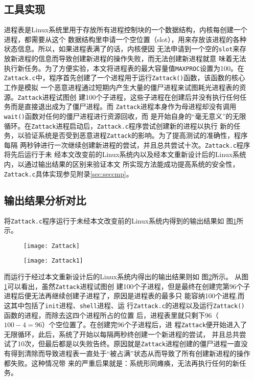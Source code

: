 \documentclass{swfuthesism}
\begin{document}
\subsection{工具实现}
进程表是Linux系统里用于存放所有进程控制块的一个数据结构，内核每创建一个进程，都需要从这个
数据结构里申请一个空位置（slot），用来存放该进程的各种状态信息。所以，如果进程表满了的话，内核便因
无法申请到一个空的\texttt{slot}来存放新进程的信息而导致创建新进程的操作失败，而无法创建新进程就意
味着无法执行新任务。为了方便实验，本文将进程表的最大容量值\texttt{MAXPROC}设置为100。在
\texttt{Zattack.c}中，程序首先创建了一个进程用于运行\texttt{Zattack()}函数，该函数的核心工作是模拟
一个恶意进程通过短期内产生大量的僵尸进程来试图耗光进程表的资源。\texttt{Zattack}进程试图创
建100个子进程，这些子进程在创建后并没有执行任何任务而是直接退出成为了僵尸进程。而
\texttt{Zattack}进程本身作为母进程却没有调用\texttt{wait()}函数对任何的僵尸进程进行资源回收，而
是开始自身的“毫无意义”的无限循环。在\texttt{Zattack}进程启动后，\texttt{Zattack.c}程序尝试创建新的进程以执行
新的任务，以验证系统是否受到恶意进程\texttt{Zattack}的影响。为了提高测试的准确性，程序每隔
两秒钟进行一次继续创建新进程的尝试，并且总共尝试十次。\texttt{Zattack.c}程序将先后运行于未
经本文改变前的Linux系统内以及经本文重新设计后的Linux系统内，以通过输出结果的区别来验证本文
所实现方法能成功提高系统的安全性，\texttt{Zattack.c}具体实现参见附录\ref{sec:seccmp}。%

\subsection{输出结果分析对比}
将\texttt{Zattack.c}程序运行于未经本文改变前的Linux系统内得到的输出结果如
图\ref{fig:Zattack}所示。

\begin{figure}[bh]
  \centering
  \texttt{[image: Zattack]}
  \label{fig:Zattack}
\end{figure}

\begin{figure}
  \centering
  \texttt{[image: Zattack1]}
  \label{fig:Zattack1}    
\end{figure}

而运行于经过本文重新设计后的Linux系统内得出的输出结果则如
图\ref{fig:Zattack1}所示。
从图\ref{fig:Zattack}可以看出，虽然\texttt{Zattack}进程试图创
建100个子进程，但是最终在创建完第96个子进程后便无法再继续创建子进程了，原因是进程表的最多只
能容纳100个进程,而这其中包括了\texttt{init}进程、\texttt{shell}进程、运
行\texttt{Zattack.c}的进程以及运行\texttt{Zattack()}函数的进程，而除去这四个进程所占的位置
后，进程表里就只剩下96（$100-4=96$）个空位置了。在创建完96个子进程后，进
程\texttt{Zattack}便开始进入了无限循环，此后，系统了开始以每隔两秒终创建一个新进程的尝试，
并且总共尝试了10次，但最后都是以失败告终。原因就是\texttt{Zattack}进程创建的僵尸进程一直没
有得到清除而导致进程表一直处于“被占满”状态从而导致了所有创建新进程的操作都失败。这种情况带
来的严重后果就是：系统形同瘫痪，无法再执行任何的新任务。
\end{document}
